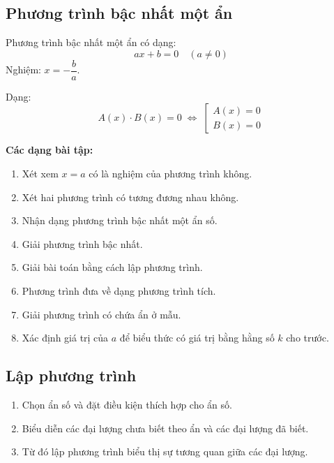 \documentclass[12pt,a4paper]{article}
\begin{document}
\subsection{Phương trình bậc nhất một ẩn}

\begin{dinhnghia}
  Phương trình bậc nhất một ẩn có dạng:
  \[ ax + b = 0 \quad (a \ne 0) \]
  Nghiệm: $x = -\dfrac{b}{a}$.
\end{dinhnghia}

\begin{tinhchat}[title={Phương trình tích}]
  Dạng:
  \[ A(x) \cdot B(x) = 0 \;\Leftrightarrow\; \left[\begin{array}{l} A(x) = 0 \\ B(x) = 0 \end{array}\right. \]
\end{tinhchat}

\medskip\noindent\textbf{Các dạng bài tập:}
\begin{enumerate}[label=\textbf{Dạng \arabic*:}, leftmargin=*, align=left]
  \item Xét xem $x = a$ có là nghiệm của phương trình không.
  \item Xét hai phương trình có tương đương nhau không.
  \item Nhận dạng phương trình bậc nhất một ẩn số.
  \item Giải phương trình bậc nhất.
  \item Giải bài toán bằng cách lập phương trình.
  \item Phương trình đưa về dạng phương trình tích.
  \item Giải phương trình có chứa ẩn ở mẫu.
  \item Xác định giá trị của $a$ để biểu thức có giá trị bằng hằng số $k$ cho trước.
\end{enumerate}

\subsection{Lập phương trình}

\begin{phuongphap}[title={Giải bài toán bằng cách lập phương trình bậc nhất}]
  \begin{enumerate}
    \item Chọn ẩn số và đặt điều kiện thích hợp cho ẩn số.
    \item Biểu diễn các đại lượng chưa biết theo ẩn và các đại lượng đã biết.
    \item Từ đó lập phương trình biểu thị sự tương quan giữa các đại lượng.
  \end{enumerate}
\end{phuongphap}
\end{document}
